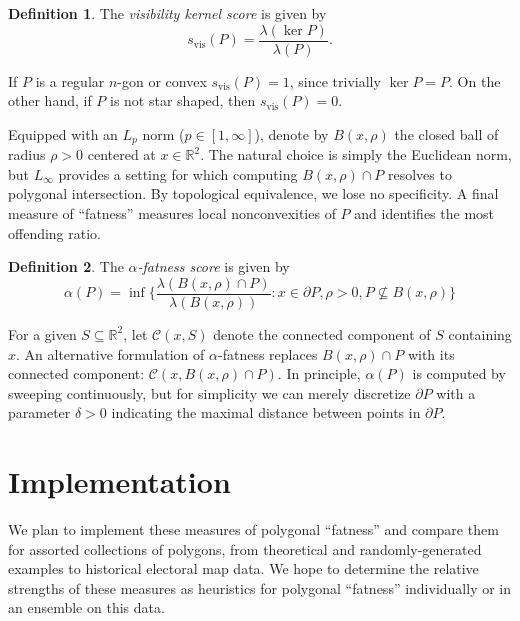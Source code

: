 \documentclass[10pt]{article}
\newcommand{\RR}{\mathbb{R}}
\newcommand{\set}[1]{\{#1\}}
\theoremstyle{definition}
\newtheorem{definition}{Definition}[section]
\begin{document}
\begin{definition}
  The \emph{visibility kernel score} is given by
  \begin{equation*}
    s_{\textrm{vis}}(P) = \frac{\lambda(\ker P)}{\lambda(P)}.
  \end{equation*}
\end{definition}

If $P$ is a regular $n$-gon or convex $s_{\textrm{vis}}(P) = 1$, since trivially
$\ker P = P$. On the other hand, if $P$ is not star shaped, then
$s_{\textrm{vis}}(P) = 0$.

Equipped with an $L_p$ norm ($p \in [1,\infty]$), denote by $B(x,\rho)$ the
closed ball of radius $\rho > 0$ centered at $x \in \RR^2$.  The natural choice
is simply the Euclidean norm, but $L_{\infty}$ provides a setting for which
computing $B(x,\rho) \cap P$ resolves to polygonal intersection. By topological
equivalence, we lose no specificity. A final measure of ``fatness'' measures
local nonconvexities of $P$ and identifies the most offending ratio.
\begin{definition}
  The \emph{$\alpha$-fatness score} is given by
  \begin{equation*}
    \alpha(P) = \inf\set{\frac{\lambda(B(x,\rho) \cap
    P)}{\lambda(B(x,\rho))} : x \in \partial P, \rho > 0, P \not\subseteq B(x,\rho)}
  \end{equation*}
\end{definition}	

For a given $S \subseteq \RR^2$, let $\mathcal{C}(x,S)$ denote the connected
component of $S$ containing $x$. An alternative formulation of $\alpha$-fatness
replaces $B(x,\rho) \cap P$ with its connected component: $\mathcal{C}(x,
B(x,\rho) \cap P)$. In principle, $\alpha(P)$ is computed by sweeping
continuously, but for simplicity we can merely discretize $\partial P$ with a
parameter $\delta > 0$ indicating the maximal distance between points in
$\partial P$.

\section{Implementation}

We plan to implement these measures of polygonal ``fatness'' and compare them
for assorted collections of polygons, from theoretical and
randomly-generated examples to historical electoral map data. We hope to
determine the relative strengths of these measures as heuristics for polygonal
``fatness'' individually or in an ensemble on this data. 
\end{document}

